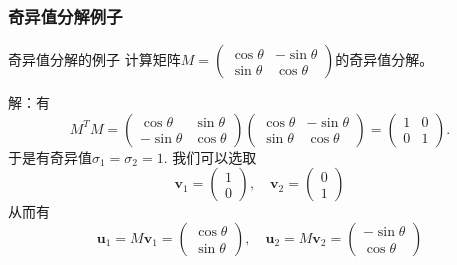 \begin{frame}
\frametitle{奇异值分解例子}

\begin{block}{奇异值分解的例子}
计算矩阵$M = \begin{pmatrix} \cos\theta & -\sin\theta \\ \sin\theta & \cos\theta \end{pmatrix}$的奇异值分解。

\vspace{1em}
\pause

解：有
$$M^TM = \begin{pmatrix} \cos\theta & \sin\theta \\ -\sin\theta & \cos\theta \end{pmatrix} \begin{pmatrix} \cos\theta & -\sin\theta \\ \sin\theta & \cos\theta \end{pmatrix} = \begin{pmatrix} 1 & 0 \\ 0 & 1 \end{pmatrix}.$$
于是有奇异值$\sigma_1 = \sigma_2 = 1$. 我们可以选取
$$\mathbf{v}_1 = \begin{pmatrix} 1 \\ 0 \end{pmatrix}, \quad \mathbf{v}_2 = \begin{pmatrix} 0 \\ 1 \end{pmatrix}$$
从而有
$$\mathbf{u}_1 = M\mathbf{v}_1 = \begin{pmatrix} \cos\theta \\ \sin\theta \end{pmatrix}, \quad \mathbf{u}_2 = M\mathbf{v}_2 = \begin{pmatrix} -\sin\theta \\ \cos\theta \end{pmatrix}$$
\end{block}

\end{frame}


